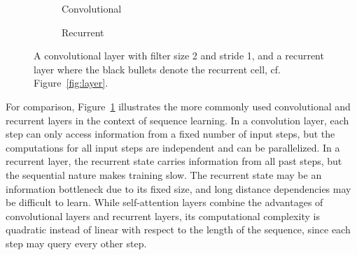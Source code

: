 \documentclass[11pt,twocolumn]{article}
\begin{document}
\begin{figure}
  \begin{subfigure}{0.5\textwidth}
    \centering
    \caption*{Convolutional}
  \end{subfigure}%
  \begin{subfigure}{0.5\textwidth}
    \centering
    \caption*{Recurrent}
  \end{subfigure}
  \caption[]{\label{fig:conv-rec}A convolutional layer with filter size 2 and stride 1,
    and a recurrent layer where the black bullets denote the recurrent cell,
    cf. Figure~\ref{fig:layer}.}
\end{figure}

For comparison, Figure~\ref{fig:conv-rec} illustrates the more commonly used convolutional and recurrent layers
in the context of sequence learning.
In a convolution layer, each step can only access information from a fixed number of input steps,
but the computations for all input steps are independent and can be parallelized.
In a recurrent layer, the recurrent state carries information from all past steps,
but the sequential nature makes training slow.
The recurrent state may be an information bottleneck due to its fixed size,
and long distance dependencies may be difficult to learn.
While self-attention layers combine the advantages of convolutional layers and recurrent layers,
its computational complexity is quadratic instead of linear with respect to the length of the sequence,
since each step may query every other step.
\end{document}
